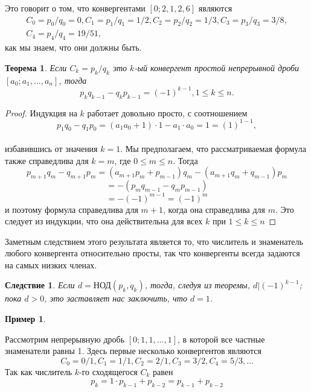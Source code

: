 \documentclass[a4paper,12pt]{article}
\newtheorem{theorem}{Теорема}
\newtheorem{corollary}{Следствие}[theorem]
\newtheorem*{remark}{Пример}
\begin{document}
	Это говорит о том, что конвергентами $[0; 2, 1, 2, 6]$ являются
	\begin{equation} \begin{split}
		C_0=p_0/q_0=0, C_1=p_1/q_1=1/2, C_2=p_2/q_2=1/3, C_3=p_3/q_3=3/8,\\ C_4=p_4/q_4=19/51,
	\end{split} \end{equation}
	как мы знаем, что они должны быть.

	\begin{theorem} \label{1} Если $C_k=p_k/q_k$ это $k$-ый конвергент простой непрерывной дроби $[a_0; a_1, ...,a_n]$, тогда \[p_k q_{k-1}-q_k p_{k-1}=(-1)^{k-1}, 1\leq k \leq n.\] \end{theorem}
    \begin{proof} Индукция на $k$ работает довольно просто, с соотношением
    \[p_1 q_0 - q_1 p_0 = (a_1 a_0 + 1) \cdot 1 - a_1 \cdot a_0 = 1 = (1)^{1-1},\]\\
    избавившись от значения $k=1$. Мы предполагаем, что рассматриваемая формула
    также справедлива для  $k=m$, где $0\leq m \leq n.$ Тогда
    \[p_{m+1} q_m - q_{m+1} p_m = (a_{m+1} p_m + p_{m-1}) q_m - (a_{m+1} q_m + q_{m-1}) p_m\] \[= -(p_m q_{m-1} - q_m p_{m-1})\] \[=-(-1)^{m-1} = (-1)^m \]
    и поэтому формула справедлива для $m+1$, когда она справедлива для $m$. Это следует из индукции, что она действительна для всех $k$ при $1\leq k \leq n$ \end{proof}
    \indent Заметным следствием этого результата является то, что числитель и знаменатель любого конвергента относительно просты, так что конвергенты всегда задаются на самых низких членах.\\
    \begin{corollary} Если $d=\text{НОД}(p_k, q_k)$, тогда, следуя из теоремы, $d|(-1)^{k-1}$; пока $d>0$, это заставляет нас заключить, что $d=1$.\end{corollary}
    \begin{remark}\end{remark}
    Рассмотрим непрерывную дробь $[0; 1, 1, ..., 1]$, в которой все частные знаменатели равны 1. Здесь первые несколько конвергентов являются 
    \[C_0 = 0/1, C_1 = 1/1, C_2 = 2/1, C_3 = 3/2, C_4 = 5/3, \ldots\]
    Так как числитель $k$-го сходящегося $C_k$ равен
    \[p_k = 1\cdot p_{k-1} + p_{k-2} = p_{k-1}+ p_{k-2} \]
    
\end{document}
